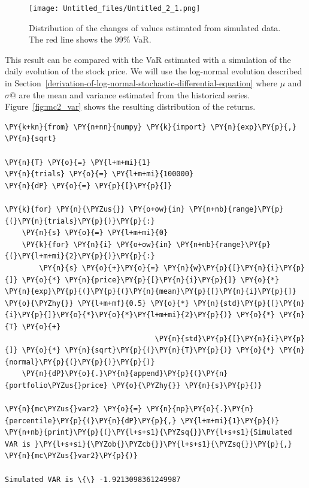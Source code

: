 \begin{figure}[htb]
	\centering
	\texttt{[image: Untitled\_files/Untitled\_2\_1.png]}
	\caption{Distribution of the changes of values estimated from simulated data. The red line shows the 99\% VaR.}
	\label{fig:mc1_var}
\end{figure}

This result can be compared with the VaR estimated with a simulation of the daily evolution of the stock price. We will use the log-normal evolution described in Section~\ref{derivation-of-log-normal-stochastic-differential-equation} where $\mu$ and $\sigma@$ are the mean and variance estimated from the historical series. Figure~\ref{fig:mc2_var} shows the resulting distribution of the returns.

\begin{tcolorbox}[breakable, size=fbox, boxrule=1pt, pad at break*=1mm,colback=cellbackground, colframe=cellborder]
\begin{Verbatim}[commandchars=\\\{\}]
\PY{k+kn}{from} \PY{n+nn}{numpy} \PY{k}{import} \PY{n}{exp}\PY{p}{,} \PY{n}{sqrt}
		
\PY{n}{T} \PY{o}{=} \PY{l+m+mi}{1}
\PY{n}{trials} \PY{o}{=} \PY{l+m+mi}{100000}
\PY{n}{dP} \PY{o}{=} \PY{p}{[}\PY{p}{]}
		
\PY{k}{for} \PY{n}{\PYZus{}} \PY{o+ow}{in} \PY{n+nb}{range}\PY{p}{(}\PY{n}{trials}\PY{p}{)}\PY{p}{:}
    \PY{n}{s} \PY{o}{=} \PY{l+m+mi}{0}
    \PY{k}{for} \PY{n}{i} \PY{o+ow}{in} \PY{n+nb}{range}\PY{p}{(}\PY{l+m+mi}{2}\PY{p}{)}\PY{p}{:}
        \PY{n}{s} \PY{o}{+}\PY{o}{=} \PY{n}{w}\PY{p}{[}\PY{n}{i}\PY{p}{]} \PY{o}{*} \PY{n}{price}\PY{p}{[}\PY{n}{i}\PY{p}{]} \PY{o}{*} \PY{n}{exp}\PY{p}{(}\PY{p}{(}\PY{n}{mean}\PY{p}{[}\PY{n}{i}\PY{p}{]} \PY{o}{\PYZhy{}} \PY{l+m+mf}{0.5} \PY{o}{*} \PY{n}{std}\PY{p}{[}\PY{n}{i}\PY{p}{]}\PY{o}{*}\PY{o}{*}\PY{l+m+mi}{2}\PY{p}{)} \PY{o}{*} \PY{n}{T} \PY{o}{+} 
                                   \PY{n}{std}\PY{p}{[}\PY{n}{i}\PY{p}{]} \PY{o}{*} \PY{n}{sqrt}\PY{p}{(}\PY{n}{T}\PY{p}{)} \PY{o}{*} \PY{n}{normal}\PY{p}{(}\PY{p}{)}\PY{p}{)}
    \PY{n}{dP}\PY{o}{.}\PY{n}{append}\PY{p}{(}\PY{n}{portfolio\PYZus{}price} \PY{o}{\PYZhy{}} \PY{n}{s}\PY{p}{)}
		
\PY{n}{mc\PYZus{}var2} \PY{o}{=} \PY{n}{np}\PY{o}{.}\PY{n}{percentile}\PY{p}{(}\PY{n}{dP}\PY{p}{,} \PY{l+m+mi}{1}\PY{p}{)}
\PY{n+nb}{print}\PY{p}{(}\PY{l+s+s1}{\PYZsq{}}\PY{l+s+s1}{Simulated VAR is }\PY{l+s+si}{\PYZob{}\PYZcb{}}\PY{l+s+s1}{\PYZsq{}}\PY{p}{,} \PY{n}{mc\PYZus{}var2}\PY{p}{)}

Simulated VAR is \{\} -1.9213098361249987
\end{Verbatim}
\end{tcolorbox}

